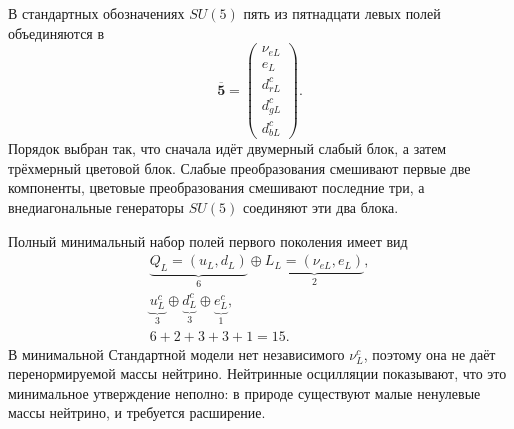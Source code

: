 В стандартных обозначениях \(SU(5)\) пять из пятнадцати левых полей объединяются в
\begin{equation}
\overline{\mathbf5}
=
\begin{pmatrix}
\nu_{eL}\\
e_L\\
d^c_{rL}\\
d^c_{gL}\\
d^c_{bL}
\end{pmatrix}.
\label{eq:l10-fivebar}
\end{equation}
Порядок выбран так, что сначала идёт двумерный слабый блок, а затем трёхмерный цветовой блок. Слабые преобразования смешивают первые две компоненты, цветовые преобразования смешивают последние три, а внедиагональные генераторы \(SU(5)\) соединяют эти два блока.


Полный минимальный набор полей первого поколения имеет вид
\begin{equation}
\begin{gathered}
\underbrace{Q_L=(u_L,d_L)}_{6}
\oplus
\underbrace{L_L=(\nu_{eL},e_L)}_{2},\\
\underbrace{u^c_L}_{3}
\oplus
\underbrace{d^c_L}_{3}
\oplus
\underbrace{e^c_L}_{1},\\
6+2+3+3+1=15.
\end{gathered}
\label{eq:l10-fifteen}
\end{equation}
В минимальной Стандартной модели нет независимого \(\nu^c_L\), поэтому она не даёт перенормируемой массы нейтрино. Нейтринные осцилляции показывают, что это минимальное утверждение неполно: в природе существуют малые ненулевые массы нейтрино, и требуется расширение.

\begin{classroomqa}
\end{classroomqa}

